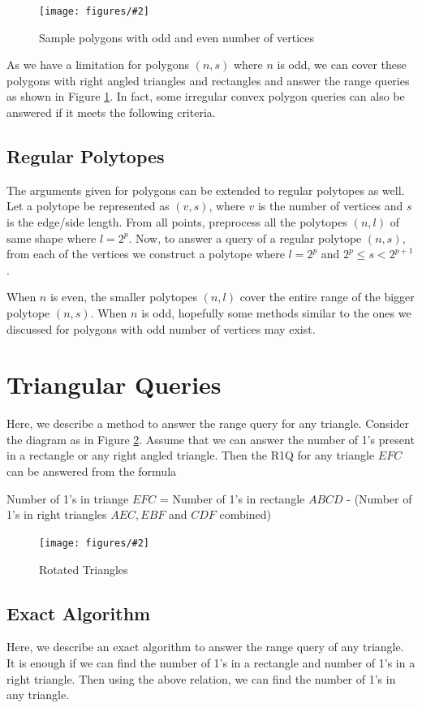 \documentclass{article}
\newcommand{\addpicture}[4]
{ \begin{figure}[H] \centering \texttt{[image: figures/\#2]} \caption{#4} \label{#3}  \end{figure} }
\begin{document}
\addpicture{width=2.6in}{polygon.png}{polygon}{Sample polygons with odd and even number of vertices}

As we have a limitation for polygons $(n, s)$ where $n$ is odd, we can cover these polygons with right angled triangles and rectangles and answer the range queries as shown in Figure \ref{polygon}. In fact, some irregular convex polygon queries can also be answered if it meets the following criteria. 

\subsection{Regular Polytopes}
The arguments given for polygons can be extended to regular polytopes as well. Let a polytope be represented as $(v, s)$, where $v$ is the number of vertices and $s$ is the edge/side length. From all points, preprocess all the polytopes $(n, l)$ of same shape where $l =2^p$. Now, to answer a query of a regular polytope $(n, s)$, from each of the vertices we construct a polytope where $l = 2^p$ and $2^p \le s < 2^{p+1}$.

When $n$ is even, the smaller polytopes $(n,l)$ cover the entire range of the bigger polytope $(n,s)$. When $n$ is odd, hopefully some methods similar to the ones we discussed for polygons with odd number of vertices may exist.

\section{Triangular Queries}
Here, we describe a method to answer the range query for any triangle. Consider the diagram as in Figure \ref{rotated}. Assume that we can answer the number of 1's present in a rectangle or any right angled triangle. Then the R1Q for any triangle $EFC$ can be answered from the formula

Number of 1's in triange $EFC$ = Number of 1's in rectangle $ABCD$ - (Number of 1's in right triangles $AEC, EBF$ and $CDF$ combined)

\addpicture{width=3in}{rotatedtriangles.png}{rotated}{Rotated Triangles}

\subsection{Exact Algorithm}
Here, we describe an exact algorithm to answer the range query of any triangle. It is enough if we can find the number of 1's in a rectangle and number of 1's in a right triangle. Then using the above relation, we can find the number of 1's in any triangle.
\end{document}

